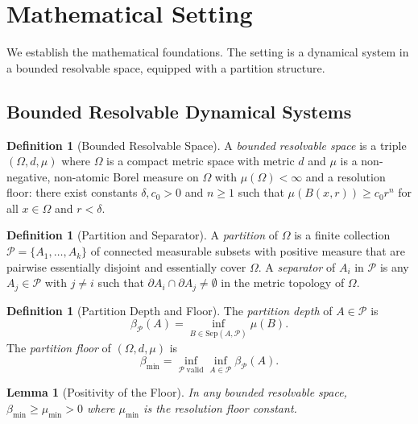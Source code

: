 \documentclass[12pt, a4paper]{article}
\theoremstyle{plain}
\newtheorem{lemma}[theorem]{Lemma}
\theoremstyle{definition}
\newtheorem{definition}[theorem]{Definition}
\theoremstyle{remark}
\newcommand{\bmin}{\beta_{\min}}
\newcommand{\mumin}{\mu_{\min}}
\newcommand{\Pcal}{\mathcal{P}}
\begin{document}
\section{Mathematical Setting}
\label{sec:setting}

We establish the mathematical foundations. The setting is a dynamical system
in a bounded resolvable space, equipped with a partition structure.

\subsection{Bounded Resolvable Dynamical Systems}

\begin{definition}[Bounded Resolvable Space]
\label{def:brs}
A \emph{bounded resolvable space} is a triple $(\Omega, d, \mu)$ where
$\Omega$ is a compact metric space with metric $d$ and $\mu$ is a non-negative,
non-atomic Borel measure on $\Omega$ with $\mu(\Omega) < \infty$ and a
resolution floor: there exist constants $\delta, c_0 > 0$ and $n \geq 1$ such
that $\mu(B(x,r)) \geq c_0 r^n$ for all $x \in \Omega$ and $r < \delta$.
\end{definition}

\begin{definition}[Partition and Separator]
\label{def:partition}
A \emph{partition} of $\Omega$ is a finite collection $\Pcal = \{A_1, \ldots,
A_k\}$ of connected measurable subsets with positive measure that are pairwise
essentially disjoint and essentially cover $\Omega$. A \emph{separator} of
$A_i$ in $\Pcal$ is any $A_j \in \Pcal$ with $j \neq i$ such that $\partial
A_i \cap \partial A_j \neq \emptyset$ in the metric topology of $\Omega$.
\end{definition}

\begin{definition}[Partition Depth and Floor]
\label{def:partdepth}
The \emph{partition depth} of $A \in \Pcal$ is
\[
  \beta_\Pcal(A) = \inf_{B \in \mathrm{Sep}(A,\Pcal)} \mu(B).
\]
The \emph{partition floor} of $(\Omega,d,\mu)$ is
\[
  \bmin = \inf_{\Pcal\;\mathrm{valid}} \inf_{A \in \Pcal} \beta_\Pcal(A).
\]
\end{definition}

\begin{lemma}[Positivity of the Floor]
\label{lem:posfloor}
In any bounded resolvable space, $\bmin \geq \mumin > 0$ where $\mumin$ is the
resolution floor constant.
\end{lemma}
\end{document}
